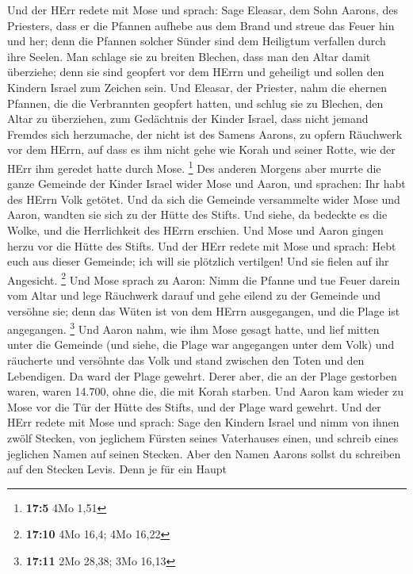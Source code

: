  Und der HErr redete mit Mose und sprach: 
Sage Eleasar, dem Sohn Aarons, des Priesters, dass er die Pfannen
aufhebe aus dem Brand und streue das Feuer hin und her; 
denn die Pfannen solcher Sünder sind dem Heiligtum verfallen durch ihre
Seelen. Man schlage sie zu breiten Blechen, dass man den Altar damit
überziehe; denn sie sind geopfert vor dem HErrn und geheiligt und sollen
den Kindern Israel zum Zeichen sein.  Und Eleasar, der
Priester, nahm die ehernen Pfannen, die die Verbrannten geopfert hatten,
und schlug sie zu Blechen, den Altar zu überziehen,  zum
Gedächtnis der Kinder Israel, dass nicht jemand Fremdes sich herzumache,
der nicht ist des Samens Aarons, zu opfern Räuchwerk vor dem HErrn, auf
dass es ihm nicht gehe wie Korah und seiner Rotte, wie der HErr ihm
geredet hatte durch Mose. \footnote{\textbf{17:5} 4Mo 1,51}
 Des anderen Morgens aber murrte die ganze Gemeinde der
Kinder Israel wider Mose und Aaron, und sprachen: Ihr habt des HErrn
Volk getötet.  Und da sich die Gemeinde versammelte wider
Mose und Aaron, wandten sie sich zu der Hütte des Stifts. Und siehe, da
bedeckte es die Wolke, und die Herrlichkeit des HErrn erschien.
 Und Mose und Aaron gingen herzu vor die Hütte des Stifts.
 Und der HErr redete mit Mose und sprach: 
Hebt euch aus dieser Gemeinde; ich will sie plötzlich vertilgen! Und sie
fielen auf ihr Angesicht. \footnote{\textbf{17:10} 4Mo 16,4; 4Mo 16,22}
 Und Mose sprach zu Aaron: Nimm die Pfanne und tue Feuer
darein vom Altar und lege Räuchwerk darauf und gehe eilend zu der
Gemeinde und versöhne sie; denn das Wüten ist von dem HErrn ausgegangen,
und die Plage ist angegangen. \footnote{\textbf{17:11} 2Mo 28,38; 3Mo
  16,13}  Und Aaron nahm, wie ihm Mose gesagt hatte, und
lief mitten unter die Gemeinde (und siehe, die Plage war angegangen
unter dem Volk) und räucherte und versöhnte das Volk  und
stand zwischen den Toten und den Lebendigen. Da ward der Plage gewehrt.
 Derer aber, die an der Plage gestorben waren, waren
14.700, ohne die, die mit Korah starben.  Und Aaron kam
wieder zu Mose vor die Tür der Hütte des Stifts, und der Plage ward
gewehrt.  Und der HErr redete mit Mose und sprach:
 Sage den Kindern Israel und nimm von ihnen zwölf
Stecken, von jeglichem Fürsten seines Vaterhauses einen, und schreib
eines jeglichen Namen auf seinen Stecken.  Aber den Namen
Aarons sollst du schreiben auf den Stecken Levis. Denn je für ein Haupt
